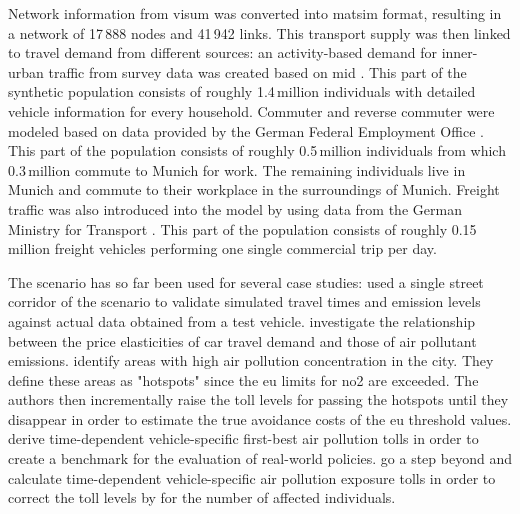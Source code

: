 Network information from \acrshort{visum} was converted into \gls{matsim} format, resulting in a network of 17\,888 nodes and 41\,942 links.
%
This transport supply was then linked to travel demand from different sources: an activity-based demand for inner-urban traffic from survey data was created based on \gls{mid} \citep[MiD 2002,][]{FollmerEtAl_TechRep_infasDIW_2004}. This part of the synthetic population consists of roughly 1.4\,million individuals with detailed vehicle information for every household.
%
Commuter and reverse commuter were modeled based on data provided by the German Federal Employment Office \citep{BoehmeEigenhueller_TechRep_IAB_2006}. This part of the population consists of roughly 0.5\,million individuals from which 0.3\,million commute to Munich for work. The remaining individuals live in Munich and commute to their workplace in the surroundings of Munich.
%
Freight traffic was also introduced into the model by using data from the German Ministry for Transport \citep{ITBBVU_TechRep_2007}. This part of the population consists of roughly 0.15\,million freight vehicles performing one single commercial trip per day.

The scenario has so far been used for several case studies:
%
\citet{HuelsmannEtAl_LAS_2011} used a single street corridor of the scenario to validate simulated travel times and emission levels against actual data obtained from a test vehicle.
%
\citet{KickhoeferEtAl_VanoutriveVerhetsel_2013} investigate the relationship between the price elasticities of car travel demand and those of air pollutant emissions.
%
\citet{HuelsmannEtAl_GerikeEtAl_2013} identify areas with high air pollution concentration in the city. They define these areas as "hotspots" since the \gls{eu} limits for \gls{no2} are exceeded. The authors then incrementally raise the toll levels for passing the hotspots until they disappear in order to estimate the true avoidance costs of the \gls{eu} threshold values.
%
\citet{KickhoeferNagel2012EmissionInternalization} derive time-dependent vehicle-specific first-best air pollution tolls in order to create a benchmark for the evaluation of real-world policies.
%
\citet{KickhoeferKern_MobilTUM_2014} go a step beyond and calculate time-dependent vehicle-specific air pollution exposure tolls in order to correct the toll levels by \citet{KickhoeferNagel2012EmissionInternalization} for the number of affected individuals.



